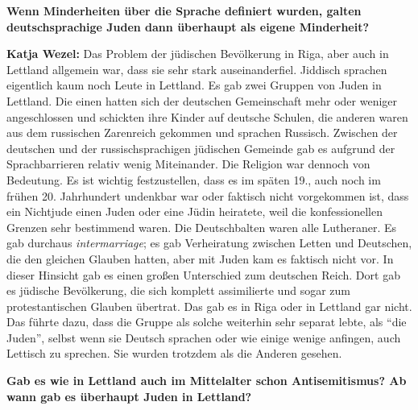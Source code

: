 \textbf{Wenn Minderheiten über die Sprache definiert wurden, galten deutschsprachige Juden dann überhaupt als eigene Minderheit?} 

\textbf{Katja Wezel:} Das Problem der jüdischen Bevölkerung in Riga, aber auch in Lettland allgemein war, dass sie sehr stark auseinanderfiel. Jiddisch sprachen eigentlich kaum noch Leute in Lettland. Es gab zwei Gruppen von Juden in Lettland. Die einen hatten sich der deutschen Gemeinschaft mehr oder weniger angeschlossen und schickten ihre Kinder auf deutsche Schulen, die anderen waren aus dem russischen Zarenreich gekommen und sprachen Russisch. Zwischen der deutschen und der russischsprachigen jüdischen Gemeinde gab es aufgrund der Sprachbarrieren relativ wenig Miteinander. 
Die Religion war dennoch von Bedeutung. Es ist wichtig festzustellen, dass es im späten 19., auch noch im frühen 20. Jahrhundert undenkbar war oder faktisch nicht vorgekommen ist, dass ein Nichtjude einen Juden oder eine Jüdin heiratete, weil die konfessionellen Grenzen sehr bestimmend waren. Die Deutschbalten waren alle Lutheraner. Es gab durchaus \textit{intermarriage}; es gab Verheiratung zwischen Letten und Deutschen, die den gleichen Glauben hatten, aber mit Juden kam es faktisch nicht vor. In dieser Hinsicht gab es einen großen Unterschied zum deutschen Reich. Dort gab es jüdische Bevölkerung, die sich komplett assimilierte und sogar zum protestantischen Glauben übertrat. Das gab es in Riga oder in Lettland gar nicht. Das führte dazu, dass die Gruppe als solche weiterhin sehr separat lebte, als ``die Juden'', selbst wenn sie Deutsch sprachen oder wie einige wenige anfingen, auch Lettisch zu sprechen. Sie wurden trotzdem als die Anderen gesehen. 

\textbf{Gab es wie in Lettland auch im Mittelalter schon Antisemitismus? Ab wann gab es überhaupt Juden in Lettland?}

